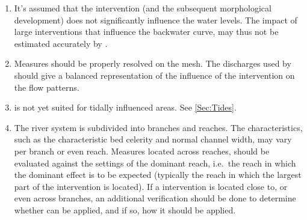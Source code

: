 \begin{enumerate}
\item It's assumed that the intervention (and the subsequent morphological development) does not significantly influence the water levels.
The impact of large interventions that influence the backwater curve, may thus not be estimated accurately by \dfmi.

\item Measures should be properly resolved on the \dflowfm mesh.
The discharges used by \dfmi should give a balanced representation of the influence of the intervention on the flow patterns.

\item \dfastmi is not yet suited for tidally influenced areas.
See \autoref{Sec:Tides}.

\item \label{reach_bnd} The river system is subdivided into branches and reaches.
The characteristics, such as the characteristic bed celerity and normal channel width, may vary per branch or even reach.
Measures located across reaches, should be evaluated against the settings of the dominant reach, i.e.~the reach in which the dominant effect is to be expected (typically the reach in which the largest part of the intervention is located).
If a intervention is located close to, or even across branches, an additional verification should be done to determine whether \dfmi can be applied, and if so, how it should be applied.


\end{enumerate}
